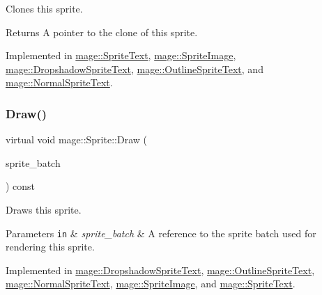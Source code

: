 Clones this sprite.

\begin{DoxyReturn}{Returns}
A pointer to the clone of this sprite. 
\end{DoxyReturn}


Implemented in \hyperlink{classmage_1_1_sprite_text_aa2c63346f5ad7f63f7a6d474df3556ef}{mage\+::\+Sprite\+Text}, \hyperlink{classmage_1_1_sprite_image_ad6460971fc4ffb425b7a43d27c9b05b2}{mage\+::\+Sprite\+Image}, \hyperlink{classmage_1_1_dropshadow_sprite_text_af997217dd243061e0490bbcd4bfde7ed}{mage\+::\+Dropshadow\+Sprite\+Text}, \hyperlink{classmage_1_1_outline_sprite_text_ac1fcc7e91b972b250e09fbb8d62f908d}{mage\+::\+Outline\+Sprite\+Text}, and \hyperlink{classmage_1_1_normal_sprite_text_acab5b61f8be4a475cd54b51278956e37}{mage\+::\+Normal\+Sprite\+Text}.

\hypertarget{classmage_1_1_sprite_a954a9f2046edcd6b1658a236ae23ec5a}{}\label{classmage_1_1_sprite_a954a9f2046edcd6b1658a236ae23ec5a} 
\subsubsection{\texorpdfstring{Draw()}{Draw()}}
{\footnotesize\ttfamily virtual void mage\+::\+Sprite\+::\+Draw (\begin{DoxyParamCaption}\item[{\hyperlink{classmage_1_1_sprite_batch}{Sprite\+Batch} \&}]{sprite\+\_\+batch }\end{DoxyParamCaption}) const\hspace{0.3cm}{\ttfamily [pure virtual]}}

Draws this sprite.


\begin{DoxyParams}[1]{Parameters}
\mbox{\tt in}  & {\em sprite\+\_\+batch} & A reference to the sprite batch used for rendering this sprite. \\
\hline
\end{DoxyParams}


Implemented in \hyperlink{classmage_1_1_dropshadow_sprite_text_af76422c9812d7dc38e9b98e587103c67}{mage\+::\+Dropshadow\+Sprite\+Text}, \hyperlink{classmage_1_1_outline_sprite_text_a524e9ad1caeeeaa32405e61d1a5e1032}{mage\+::\+Outline\+Sprite\+Text}, \hyperlink{classmage_1_1_normal_sprite_text_ad2a1b02bea18afd6bf61b106a727a355}{mage\+::\+Normal\+Sprite\+Text}, \hyperlink{classmage_1_1_sprite_image_ae30d3293931f674fea17008063755bb6}{mage\+::\+Sprite\+Image}, and \hyperlink{classmage_1_1_sprite_text_a45d5ac8410d5a46b26e8491946a2ad9e}{mage\+::\+Sprite\+Text}.

